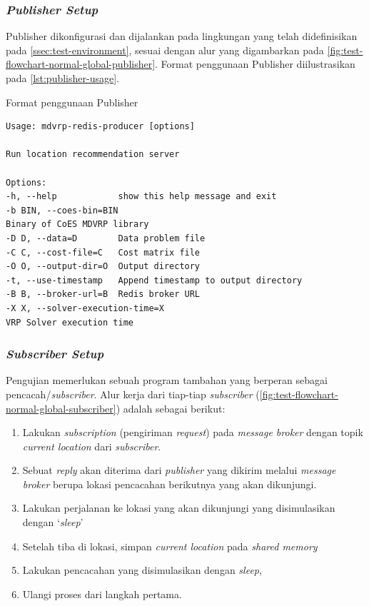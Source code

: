 \subsubsection{\textit{Publisher Setup}}
Publisher dikonfigurasi dan dijalankan pada lingkungan yang telah didefinisikan pada \autoref{ssec:test-environment}, sesuai dengan alur yang digambarkan pada \autoref{fig:test-flowchart-normal-global-publisher}. Format penggunaan Publisher diilustrasikan pada \autoref{lst:publisher-usage}.


\begin{listing}[!]
	\caption{Format penggunaan Publisher}
	\label{lst:publisher-usage}
	\begin{verbatim}
Usage: mdvrp-redis-producer [options]

Run location recommendation server

Options:
-h, --help            show this help message and exit
-b BIN, --coes-bin=BIN
Binary of CoES MDVRP library
-D D, --data=D        Data problem file
-C C, --cost-file=C   Cost matrix file
-O O, --output-dir=O  Output directory
-t, --use-timestamp   Append timestamp to output directory
-B B, --broker-url=B  Redis broker URL
-X X, --solver-execution-time=X
VRP Solver execution time
	\end{verbatim}
\end{listing}


\subsubsection{\textit{Subscriber Setup}}
\label{sssec:subscriber-setup}
Pengujian memerlukan sebuah program tambahan yang berperan sebagai pencacah/\textit{subscriber}. Alur kerja dari tiap-tiap \textit{subscriber} (\autoref{fig:test-flowchart-normal-global-subscriber}) adalah sebagai berikut:


\begin{enumerate}
	\item Lakukan \textit{subscription} (pengiriman \textit{request}) pada \textit{message broker} dengan topik \textit{current location} dari \textit{subscriber}. 
	\item Sebuat \textit{reply} akan diterima dari \textit{publisher} yang dikirim melalui \textit{message broker} berupa lokasi pencacahan berikutnya yang akan dikunjungi. 
	\item Lakukan perjalanan ke lokasi yang akan dikunjungi yang disimulasikan dengan `\textit{sleep}'
	\item Setelah tiba di lokasi, simpan \textit{current location} pada \textit{shared memory} 
	\item Lakukan pencacahan yang disimulasikan dengan \textit{sleep}, 
	\item Ulangi proses dari langkah pertama.
\end{enumerate}


